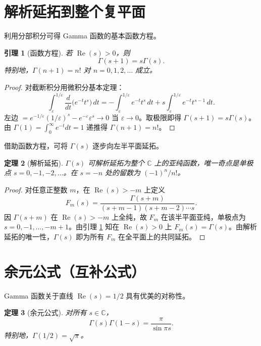 \documentclass[UTF8]{ctexart}
\newtheorem{theorem}{定理}[section]
\newtheorem{lemma}[theorem]{引理}
\numberwithin{equation}{section}
\newcommand{\CC}{\mathbb{C}}
\begin{document}
\section{解析延拓到整个复平面}

利用分部积分可得 Gamma 函数的基本函数方程。

\begin{lemma}[函数方程]\label{lem:FuncEq}
若 \(\operatorname{Re}(s)>0\)，则
\[
\Gamma(s+1)=s\Gamma(s).
\]
特别地，\(\Gamma(n+1)=n!\) 对 \(n=0,1,2,\dots\) 成立。
\end{lemma}

\begin{proof}
对截断积分用微积分基本定理：
\[
\int_{\varepsilon}^{1/\varepsilon} \frac{d}{dt}\bigl(e^{-t}t^{s}\bigr)\, dt
= -\int_{\varepsilon}^{1/\varepsilon} e^{-t}t^{s}\, dt + s\int_{\varepsilon}^{1/\varepsilon} e^{-t}t^{s-1}\, dt.
\]
左边 \(=e^{-1/\varepsilon}(1/\varepsilon)^{s}-e^{-\varepsilon}\varepsilon^{s}\to0\) 当 \(\varepsilon\to0\)。取极限即得 \(\Gamma(s+1)=s\Gamma(s)\)。由 \(\Gamma(1)=\int_{0}^{\infty}e^{-t}dt=1\) 递推得 \(\Gamma(n+1)=n!\)。
\end{proof}

借助函数方程，可将 \(\Gamma(s)\) 逐步向左半平面延拓。

\begin{theorem}[解析延拓]\label{thm:GammaCont}
\(\Gamma(s)\) 可解析延拓为整个 \(\CC\) 上的亚纯函数，唯一奇点是单极点 \(s=0,-1,-2,\dots\)。在 \(s=-n\) 处的留数为 \((-1)^{n}/n!\)。
\end{theorem}

\begin{proof}
对任意正整数 \(m\)，在 \(\operatorname{Re}(s)>-m\) 上定义
\[
F_{m}(s)=\frac{\Gamma(s+m)}{(s+m-1)(s+m-2)\cdots s}.
\]
因 \(\Gamma(s+m)\) 在 \(\operatorname{Re}(s)>-m\) 上全纯，故 \(F_{m}\) 在该半平面亚纯，单极点为 \(s=0,-1,\dots,-m+1\)。由引理 \ref{lem:FuncEq} 知在 \(\operatorname{Re}(s)>0\) 上 \(F_{m}(s)=\Gamma(s)\)。由解析延拓的唯一性，\(\Gamma(s)\) 即为所有 \(F_{m}\) 在全平面上的共同延拓。
\end{proof}

\section{余元公式（互补公式）}

Gamma 函数关于直线 \(\operatorname{Re}(s)=1/2\) 具有优美的对称性。

\begin{theorem}[余元公式]\label{thm:Complement}
对所有 \(s\in\CC\)，
\begin{equation}
\Gamma(s)\Gamma(1-s)=\frac{\pi}{\sin\pi s}.
\end{equation}
特别地，\(\Gamma(1/2)=\sqrt{\pi}\)。
\end{theorem}
\end{document}
